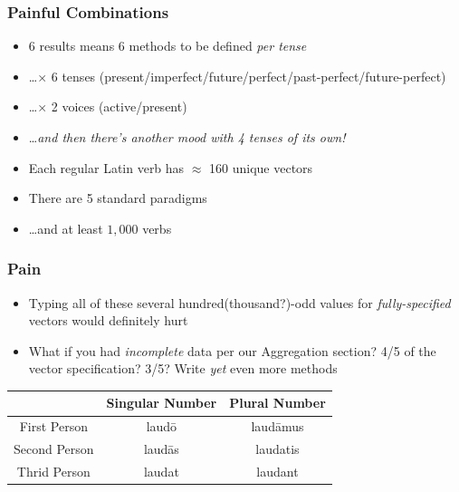 \documentclass[slidestop,compress,mathserif]{beamer}
\begin{document}
\begin{frame}
	\frametitle{Painful Combinations}
	\begin{itemize}
		\item 6 results means 6 methods to be defined \emph{per tense}
		\pause
		\item \ldots $\times$ 6 tenses (present/imperfect/future/perfect/past-perfect/future-perfect)
		\pause
		\item \ldots $\times$ 2 voices (active/present)
		\pause
		\item \ldots \emph{and then there's another mood with 4 tenses of its own!}
		\pause
		\item Each regular Latin verb has $\approx$  160 unique vectors
		\pause
		\item There are 5 standard paradigms
		\pause
		\item \ldots and at least $1,000$ verbs
	\end{itemize}
\end{frame}

\begin{frame}
		\frametitle{Pain}
		\begin{itemize}
			\item Typing all of these several hundred(thousand?)-odd values for \emph{fully-specified} vectors would definitely hurt
			\pause
			\item What if you had \emph{incomplete} data per our Aggregation section?  4/5 of the vector specification?  3/5?  Write \emph{yet} even more methods
		\end{itemize}
		\begin{center}
			\begin{tabular}{|c|c|c|}
				\hline
				  & Singular Number &  Plural Number\\
				\hline
				First Person  & laud\={o}  & laud\={a}mus\\
				Second Person & laud\={a}s & laudatis \\
				Thrid Person  & laudat     & laudant \\
				\hline
			\end{tabular}
		\end{center}
\end{frame}
\end{document}

